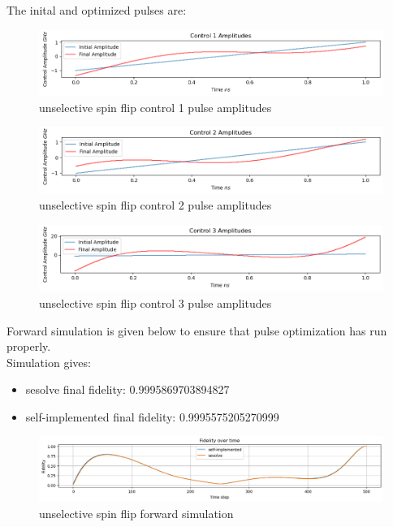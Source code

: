 \documentclass[12pt]{report}
\begin{document}
The inital and optimized pulses are: 
\begin{figure}[H]
    \centering
    \includegraphics[width=0.95\linewidth]{unselective_spin_flip_control1.png}
    \caption{unselective spin flip control 1 pulse amplitudes}
    \label{fig:unselective_spin_flip_control1}
\end{figure}
\begin{figure}[H]
    \centering
    \includegraphics[width=0.95\linewidth]{unselective_spin_flip_control2.png}
    \caption{unselective spin flip control 2 pulse amplitudes}
    \label{fig:unselective_spin_flip_control2}
\end{figure}
\begin{figure}[H]
    \centering
    \includegraphics[width=0.95\linewidth]{unselective_spin_flip_control3.png}
    \caption{unselective spin flip control 3 pulse amplitudes}
    \label{fig:unselective_spin_flip_control3}
\end{figure}

Forward simulation is given below to ensure that pulse optimization has run properly. 
\\
Simulation gives: 
\begin{itemize}
    \item sesolve final fidelity:  0.9995869703894827
    \item self-implemented final fidelity:  0.9995575205270999
\end{itemize}
\begin{figure}[H]
    \centering
    \includegraphics[width=0.95\linewidth]{unselective_spin_flip_simulation.png}
    \caption{unselective spin flip forward simulation}
    \label{fig:unselective_spin_flip_forward_simulation}
\end{figure}
\end{document}
